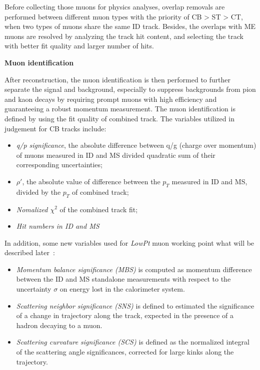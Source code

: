Before collecting those muons for physics analyses, overlap removals are performed between different muon types with the priority of CB > ST > CT, when two types of muons share the same ID track.
Besides, the overlaps with ME muons are resolved by analyzing the track hit content, and selecting the track with better fit quality and larger number of hits.

\textbf{Muon identification}

After reconstruction, the muon identification is then performed to further separate the signal and background, especially to suppress backgrounds from pion and kaon decays by requiring prompt muons with high efficiency and guaranteeing a robust momentum measurement.
The muon identification is defined by using the fit quality of combined track. 
The variables utilized in judgement for CB tracks include:
\begin{itemize}
	\item \textit{q/p significance}, the absolute difference between q/g (charge over momentum) of muons measured in ID and MS divided quadratic sum of their corresponding uncertainties;
	\item \textit{$\rho'$}, the absolute value of difference between the $p_{T}$ measured in ID and MS, divided by the $p_{T}$ of combined track;
	\item \textit{Nomalized $\chi^{2}$} of the combined track fit;
	\item \textit{Hit numbers in ID and MS}
\end{itemize}
In addition, some new variables used for \textit{LowPt} muon working point what will be described later~\cite{Zheng:2649299}:
\begin{itemize}
	\item \textit{Momentum balance significance (MBS) } is computed as momentum difference between the ID and MS standalone measurements with respect to the uncertainty $\sigma$ on energy lost in the calorimeter system.
	\item \textit{Scattering neighbor significance (SNS)} is defined to estimated the significance of a change in trajectory along the track, expected in the presence of a hadron decaying to a muon.
	\item \textit{Scattering curvature significance (SCS)} is defined as the normalized integral of the scattering angle significances, corrected for large kinks along the trajectory.
\end{itemize}

